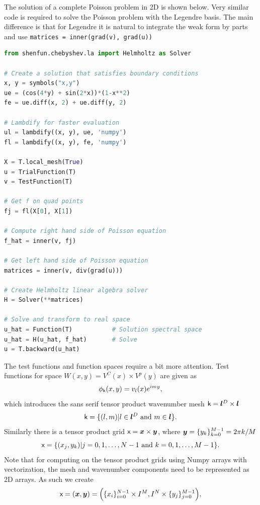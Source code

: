\documentclass[%
oneside,                 %
final,                   %
10pt]{article}
\begin{document}
The solution of a complete Poisson problem in 2D is shown below. Very similar code is required to solve the Poisson problem with the Legendre basis. The main difference is that for Legendre it is natural to integrate the weak form by parts and use \texttt{matrices = inner(grad(v), grad(u))}
\begin{lstlisting}[language=Python,style=yellow2_fb]
from shenfun.chebyshev.la import Helmholtz as Solver

# Create a solution that satisfies boundary conditions
x, y = symbols("x,y")
ue = (cos(4*y) + sin(2*x))*(1-x**2)
fe = ue.diff(x, 2) + ue.diff(y, 2)

# Lambdify for faster evaluation
ul = lambdify((x, y), ue, 'numpy')
fl = lambdify((x, y), fe, 'numpy')

X = T.local_mesh(True)
u = TrialFunction(T)
v = TestFunction(T)

# Get f on quad points
fj = fl(X[0], X[1])

# Compute right hand side of Poisson equation
f_hat = inner(v, fj)

# Get left hand side of Poisson equation
matrices = inner(v, div(grad(u)))

# Create Helmholtz linear algebra solver
H = Solver(**matrices)

# Solve and transform to real space
u_hat = Function(T)           # Solution spectral space
u_hat = H(u_hat, f_hat)       # Solve
u = T.backward(u_hat)
\end{lstlisting}
The test functions and function spaces require a bit more attention. Test functions for space $W(x, y)=V^C(x) \times V^p(y)$ are given as
\begin{equation}
\phi_{\boldsymbol{\textsf{k}}}(x, y) = v_l(x) e^{imy},
\end{equation}
which introduces the sans serif tensor product wavenumber mesh $\boldsymbol{\textsf{k}} = \boldsymbol{l}^D \times \boldsymbol{l}$
\begin{equation}
 \boldsymbol{\textsf{k}} = \{ (l, m) | l \in \boldsymbol{l}^D \text{ and } m \in \boldsymbol{l}\}.
\end{equation}
Similarly there is a tensor product grid $\boldsymbol{\textsf{x}} = \boldsymbol{x} \times \boldsymbol{y}$, where $\boldsymbol{y} = \{y_k\}_{k=0}^{M-1} = 2 \pi k /M$
\begin{equation}
 \boldsymbol{\textsf{x}} = \{ (x_j, y_k) | j=0,1,\ldots, N-1 \text{ and } k=0,1,\ldots, M-1\}.
\end{equation}
Note that for computing on the tensor product grids using Numpy arrays with vectorization, the mesh and wavenumber components need to be represented as 2D arrays. As such we create
\begin{equation}
\boldsymbol{\textsf{x}} = (\boldsymbol{x}, \boldsymbol{y}) = \Big(\{x_i\}_{i=0}^{N-1} \times I^M,  I^N \times \{y_j\}_{j=0}^{M-1} \Big),
\end{equation}
\end{document}
